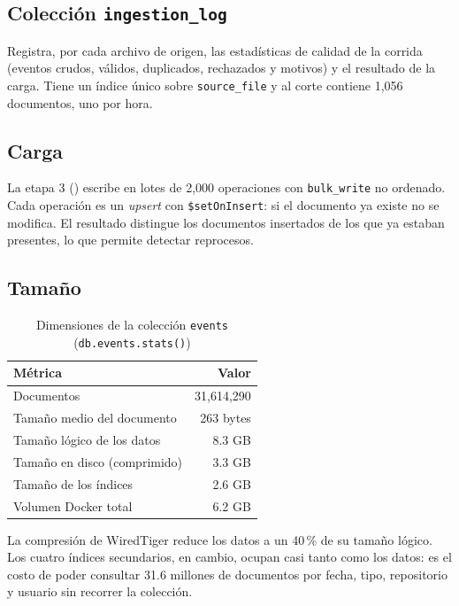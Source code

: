 \subsection{Colección \texttt{ingestion\_log}}

Registra, por cada archivo de origen, las estadísticas de calidad de la corrida (eventos crudos, válidos, duplicados, rechazados y motivos) y el resultado de la carga. Tiene un índice único sobre \texttt{source\_file} y al corte contiene 1,056 documentos, uno por hora.

\subsection{Carga}

La etapa 3 () escribe en lotes de 2,000 operaciones con \texttt{bulk\_write} no ordenado. Cada operación es un \textit{upsert} con \texttt{\$setOnInsert}: si el documento ya existe no se modifica. El resultado distingue los documentos insertados de los que ya estaban presentes, lo que permite detectar reprocesos.

\subsection{Tamaño}

\begin{table}[H]
\centering
\caption{Dimensiones de la colección \texttt{events} (\texttt{db.events.stats()})}
\label{tab:mongo-stats}
\vspace{0.2cm}
\small
\begin{tabular}{@{}lr@{}}
\toprule
\textbf{Métrica} & \textbf{Valor} \\
\midrule
Documentos                         & 31,614,290 \\
Tamaño medio del documento         & 263 bytes \\
Tamaño lógico de los datos         & 8.3 GB \\
Tamaño en disco (comprimido)       & 3.3 GB \\
Tamaño de los índices              & 2.6 GB \\
Volumen Docker total               & 6.2 GB \\
\bottomrule
\end{tabular}
\end{table}

La compresión de WiredTiger reduce los datos a un 40\,\% de su tamaño lógico. Los cuatro índices secundarios, en cambio, ocupan casi tanto como los datos: es el costo de poder consultar 31.6 millones de documentos por fecha, tipo, repositorio y usuario sin recorrer la colección.

